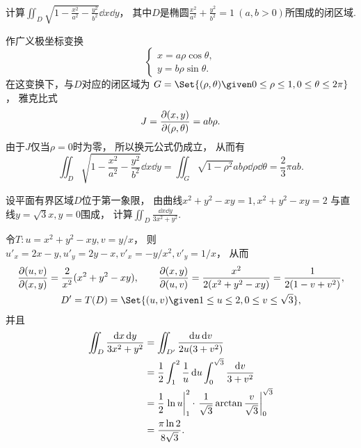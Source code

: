 \begin{example}
计算\(\iint_D \sqrt{1 - \frac{x^2}{a^2} - \frac{y^2}{b^2}} \dd{x} \dd{y}\)，
其中\(D\)是椭圆\(\frac{x^2}{a^2} + \frac{y^2}{b^2} = 1\ (a,b>0)\)所围成的闭区域.
\begin{solution}
作广义极坐标变换\[
	\left\{ \begin{array}{l}
		x = a \rho \cos\theta, \\
		y = b \rho \sin\theta.
	\end{array} \right.
\]
在这变换下，与\(D\)对应的闭区域为
\(G = \Set{(\rho,\theta) \given 0\leq\rho\leq1,0\leq\theta\leq2\pi}\)，
雅克比式\[
	J = \pdv{ (x,y) }{ (\rho,\theta) } = ab\rho.
\]
由于\(J\)仅当\(\rho=0\)时为零，
所以换元公式仍成立，
从而有\[
	\iint_D \sqrt{1 - \frac{x^2}{a^2} - \frac{y^2}{b^2}} \dd{x} \dd{y}
	= \iint_G \sqrt{1-\rho^2} ab\rho \dd{\rho} \dd{\theta}
	= \frac23 \pi ab.
\]
\end{solution}
\end{example}

\begin{example}
设平面有界区域\(D\)位于第一象限，
由曲线\(x^2+y^2-xy=1,
x^2+y^2-xy=2\)
与直线\(y=\sqrt3 x,
y=0\)围成，
计算\(\iint_D \frac{\dd{x}\dd{y}}{3x^2+y^2}\).
\begin{solution}
令\(T: u=x^2+y^2-xy,
v=y/x\)，
则\(u'_x=2x-y,
u'_y=2y-x,
v'_x=-y/x^2,
v'_y=1/x\)，
从而\begin{gather*}
	\jacobi{u,v}{x,y} = \frac2{x^2} (x^2+y^2-xy),
	\qquad
	\jacobi{x,y}{u,v} = \frac{x^2}{2(x^2+y^2-xy)}
	= \frac1{2(1-v+v^2)}, \\
	D' = T(D)
	= \Set{ (u,v) \given 1 \leq u \leq 2, 0 \leq v \leq \sqrt3 },
\end{gather*}
并且\begin{align*}
	\iint_D \frac{\dd{x}\dd{y}}{3x^2+y^2}
	&= \iint_{D'} \frac{\dd{u}\dd{v}}{2u(3+v^2)} \\
	&= \frac12 \int_1^2 \frac1u \dd{u} \int_0^{\sqrt3} \frac{\dd{v}}{3+v^2} \\
	&= \frac12 \eval{\ln u}_1^2 \cdot \eval{\frac1{\sqrt3} \arctan\frac{v}{\sqrt3}}_0^{\sqrt3} \\
	&= \frac{\pi \ln2}{8\sqrt3}.
\end{align*}
\end{solution}
\end{example}

